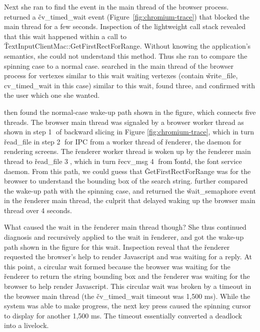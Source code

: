 \begin{figure*}[p]
    \centering
	 
    \caption{Chromium case study.}
    \label{fig:chromium-trace}
\end{figure*}

Next she ran \xxx to find the event in the main thread of the browser process.
\xxx returned a \v{cv\_timed\_wait} event (Figure~\ref{fig:chromium-trace})
that blocked the main thread for a few seconds.  Inspection of the lightweight
call stack revealed that this wait happened within a call to
\v{TextInputClientMac::GetFirstRectForRange}.  Without knowing the
application's semantics, she could not understand this method.  Thus she ran
\xxx to compare the spinning case to a normal case.  \xxx searched in the main
thread of the browser process for vertexes similar to this wait waiting
vertexes (contain \v{write\_file, cv\_timed\_wait} in this case) similar to
this wait, found three, and confirmed with the user which one she wanted.

\xxx then found the normal-case wake-up path shown in the figure, which
connects five threads.  The browser main thread was signaled by a browser
worker thread as shown in step \textcircled{1} of backward slicing in Figure
\ref{fig:chromium-trace}, which in turn \v{read\_file} in step \textcircled{2}
for IPC from a worker thread of \v{renderer}, the daemon for rendering screens.
The \v{renderer} worker thread is woken up by the \v{renderer} main thread to
\v{read\_file} \textcircled{3}, which in turn \v{recv\_msg} \textcircled{4}
from \v{fontd}, the font service daemon.  From this path, we could guess that
\v{GetFirstRectForRange} was for the browser to understand the bounding box of
the search string.  \xxx further compared the wake-up path with the spinning
case, and returned the \v{wait\_semaphore} event in the \v{renderer} main
thread, the culprit that delayed waking up the browser main thread over 4
seconds.

What caused the wait in the \v{renderer} main thread though?  She thus
continued diagnosis and recursively applied \xxx to the wait in \v{renderer},
and got the wake-up path shown in the figure for this wait.  Inspection reveal
that the \v{renderer} requested the browser's help to render Javascript and was
waiting for a reply.  At this point, a circular wait formed because the browser
was waiting for the \v{renderer} to return the string bounding box and the
\v{renderer} was waiting for the browser to help render Javascript.  This
circular wait was broken by a timeout in the browser main thread (the
\v{cv\_timed\_wait} timeout was 1,500 ms).  While the system was able to make
progress, the next key press caused the spinning cursor to display for another
1,500 ms.  The timeout essentially converted a deadlock into a livelock.

